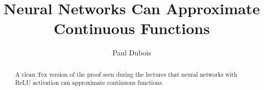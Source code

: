 \documentclass[]{article}
\title{Neural Networks Can Approximate Continuous Functions}
\author{Paul Dubois}
\date{}
\begin{document}
	
	\maketitle
	
	\begin{abstract}
		A clean Tex version of the proof seen during the lectures that neural networks with ReLU activation can approximate continuous functions.
	\end{abstract}
	
	\section{}
	
\end{document}
